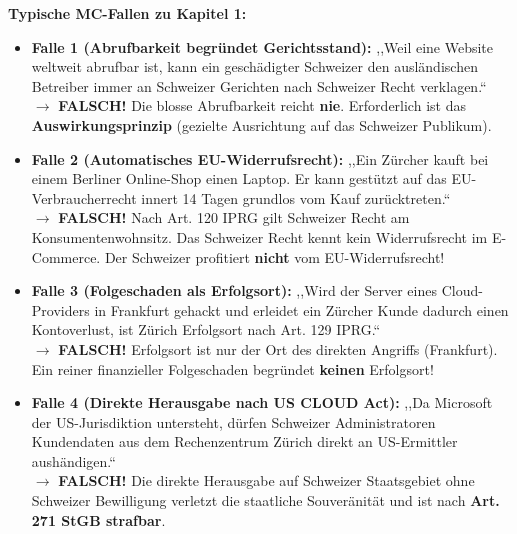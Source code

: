 \begin{important}
    \textbf{Typische MC-Fallen zu Kapitel 1:}
    \begin{itemize}
        \item \textbf{Falle 1 (Abrufbarkeit begründet Gerichtsstand):} ,,Weil eine Website weltweit abrufbar ist, kann ein geschädigter Schweizer den ausländischen Betreiber immer an Schweizer Gerichten nach Schweizer Recht verklagen.`` \\
        $\rightarrow$ \textbf{FALSCH!} Die blosse Abrufbarkeit reicht \textbf{nie}. Erforderlich ist das \textbf{Auswirkungsprinzip} (gezielte Ausrichtung auf das Schweizer Publikum).
        \item \textbf{Falle 2 (Automatisches EU-Widerrufsrecht):} ,,Ein Zürcher kauft bei einem Berliner Online-Shop einen Laptop. Er kann gestützt auf das EU-Verbraucherrecht innert 14 Tagen grundlos vom Kauf zurücktreten.`` \\
        $\rightarrow$ \textbf{FALSCH!} Nach Art. 120 IPRG gilt Schweizer Recht am Konsumentenwohnsitz. Das Schweizer Recht kennt kein Widerrufsrecht im E-Commerce. Der Schweizer profitiert \textbf{nicht} vom EU-Widerrufsrecht!
        \item \textbf{Falle 3 (Folgeschaden als Erfolgsort):} ,,Wird der Server eines Cloud-Providers in Frankfurt gehackt und erleidet ein Zürcher Kunde dadurch einen Kontoverlust, ist Zürich Erfolgsort nach Art. 129 IPRG.`` \\
        $\rightarrow$ \textbf{FALSCH!} Erfolgsort ist nur der Ort des direkten Angriffs (Frankfurt). Ein reiner finanzieller Folgeschaden begründet \textbf{keinen} Erfolgsort!
        \item \textbf{Falle 4 (Direkte Herausgabe nach US CLOUD Act):} ,,Da Microsoft der US-Jurisdiktion untersteht, dürfen Schweizer Administratoren Kundendaten aus dem Rechenzentrum Zürich direkt an US-Ermittler aushändigen.`` \\
        $\rightarrow$ \textbf{FALSCH!} Die direkte Herausgabe auf Schweizer Staatsgebiet ohne Schweizer Bewilligung verletzt die staatliche Souveränität und ist nach \textbf{Art. 271 StGB strafbar}.
    \end{itemize}
\end{important}
